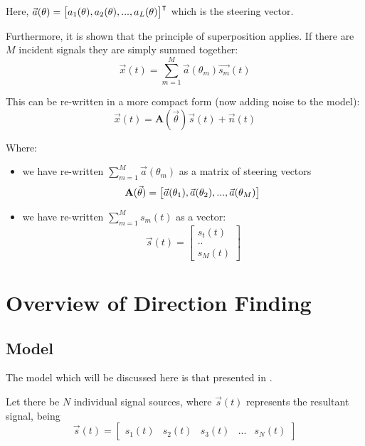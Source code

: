 Here, \(\vec{a}(\theta) = \begin{bmatrix} a_1(\theta), a_2(\theta), ... , a_L(\theta) \end{bmatrix}^\intercal\) which is the steering vector.

  Furthermore, it is shown that the principle of superposition applies. If there are \(M\) incident signals they are simply summed together:
\begin{equation}
  \vec{x}(t) = \sum_{m=1}^{M} \vec{a}(\theta_m)\vec{s_m}(t)
\end{equation}

This can be re-written in a more compact form (now adding noise to the model):
\begin{equation}
  \vec{x}(t) = \mathbf{A}(\vec{\theta})\vec{s}(t) + \vec{n}(t)
\end{equation}

Where:
\begin{itemize} 
  \item we have re-written \(\sum_{m=1}^{M}\vec{a}(\theta_m)\) as a matrix of steering vectors
\begin{equation} 
  \mathbf{A}(\vec{\theta}) = \begin{bmatrix} \vec{a}(\theta_1), \vec{a}(\theta_2), ..., \vec{a}(\theta_M) \end{bmatrix} \\
\end{equation}
  \item we have re-written  \(\sum_{m=1}^{M}s_m(t)\) as a vector:
\begin{equation}
  \vec{s}(t) = \begin{bmatrix} s_t(t) \\ .. \\ s_M(t) \end{bmatrix}
\end{equation}
\end{itemize}
\section{Overview of Direction Finding}

\subsection{Model}
The model which will be discussed here is that presented in \cite{poisel2012electronic}.  

Let there be $N$ individual signal sources, where $\vec{s}(t)$ represents the resultant signal, being
\begin{equation}
\vec{s}(t) = \begin{bmatrix} s_{1}(t) & s_{2}(t) & s_3(t) & ... & s_N(t) \end{bmatrix}
\end{equation}

